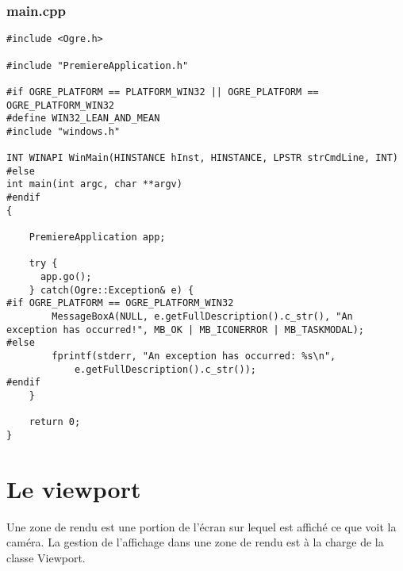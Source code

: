 \documentclass[10pt,a4paper]{report}
\begin{document}
\subsubsection{main.cpp}
\begin{lstlisting}[caption={main.cpp: Cr\'eation de la cam\'era}]
#include <Ogre.h>

#include "PremiereApplication.h"

#if OGRE_PLATFORM == PLATFORM_WIN32 || OGRE_PLATFORM == OGRE_PLATFORM_WIN32
#define WIN32_LEAN_AND_MEAN
#include "windows.h"

INT WINAPI WinMain(HINSTANCE hInst, HINSTANCE, LPSTR strCmdLine, INT)
#else
int main(int argc, char **argv)
#endif
{

    PremiereApplication app;
    
    try {
      app.go();
    } catch(Ogre::Exception& e) {
#if OGRE_PLATFORM == OGRE_PLATFORM_WIN32
        MessageBoxA(NULL, e.getFullDescription().c_str(), "An exception has occurred!", MB_OK | MB_ICONERROR | MB_TASKMODAL);
#else
        fprintf(stderr, "An exception has occurred: %s\n",
            e.getFullDescription().c_str());
#endif
    }

    return 0;
}
\end{lstlisting}




































\section{Le viewport}

Une zone de rendu est une portion de l'\'ecran sur lequel est affich\'e ce que voit la cam\'era. La gestion de l'affichage dans une zone de rendu est \`{a} la charge de la classe Viewport.
\end{document}
